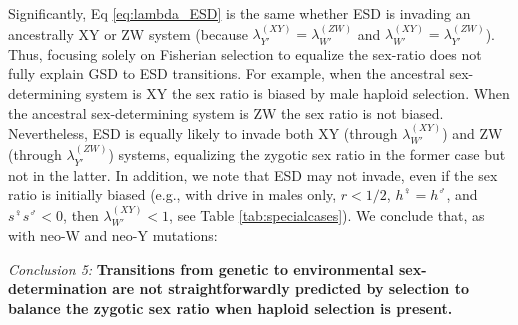 \documentclass[10pt,letterpaper]{article}
\providecommand{\DIFdelbegin}{} %
\begin{document}

Significantly, Eq \eqref{eq:lambda_ESD} is the same whether ESD is invading an ancestrally XY or ZW system (because $\lambda_{Y'}^{(XY)} = \lambda_{W'}^{(ZW)}$ and $\lambda_{W'}^{(XY)} = \lambda_{Y'}^{(ZW)}$).
Thus, focusing solely on Fisherian selection to equalize the sex-ratio does not fully explain GSD to ESD transitions.
For example, when the ancestral sex-determining system is XY the sex ratio is biased by male haploid selection.
When the ancestral sex-determining system is ZW the sex ratio is not biased.
Nevertheless, ESD is equally likely to invade both XY (through $\lambda_{W'}^{(XY)}$) and ZW (through $\lambda_{Y'}^{(ZW)}$) systems, equalizing the zygotic sex ratio in the former case but not in the latter. 
In addition, we note that ESD may not invade, even if the sex ratio is initially biased (e.g., with drive in males only, $r<1/2$, $h^\female=h^\male$, and $s^\female s^\male<0$, then $\lambda_{W'}^{(XY)}<1$, see Table \ref{tab:specialcases}). 
We conclude that, as with neo-W and neo-Y mutations:
\vspace{0.5cm}

\noindent\textit{Conclusion 5:}
\textbf{
Transitions from genetic to environmental sex-determination are not straightforwardly predicted by selection to balance the zygotic sex ratio when haploid selection is present. 
}

\DIFdelbegin %
\end{document}

